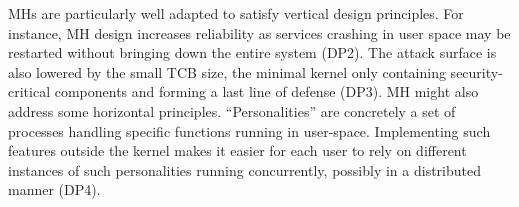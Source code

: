 \documentclass{sig-alternate}
\begin{document}
MHs are particularly well adapted to satisfy vertical design principles.
For instance, MH design increases reliability as services crashing in user space may be restarted without bringing down the entire system (DP2).
The attack surface is also lowered by the small TCB size, the minimal kernel only containing security-critical components and forming a last line of defense (DP3).
MH might also address some horizontal principles. 
``Personalities'' are concretely a set of processes handling specific functions running in user-space. Implementing such features outside the kernel makes it easier for each user to rely on different instances of such personalities running concurrently, possibly in a distributed manner (DP4).




%
\end{document}
